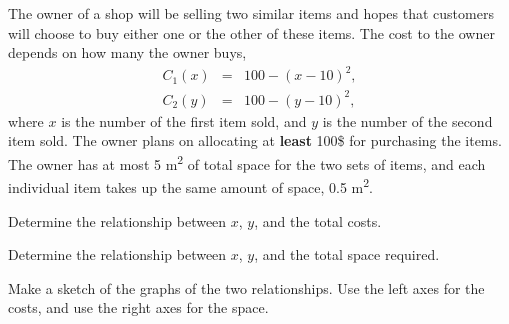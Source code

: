 \begin{problem}
\clearpage

\item The owner of a shop will be selling two similar items and hopes
  that customers will choose to buy either one or the other of these
  items. The cost to the owner depends on how many the owner buys,
  \begin{eqnarray*}
    C_1(x) & = & 100 - (x-10)^2, \\
    C_2(y) & = & 100 - (y-10)^2,
  \end{eqnarray*}
  where $x$ is the number of the first item sold, and $y$ is the
  number of the second item sold. The owner plans on allocating at
  \textbf{least} 100\$ for purchasing the items.  The owner has at most 5
  m\textsuperscript{2} of total space for the two sets of items, and
  each individual item takes up the same amount of space, 0.5
  m\textsuperscript{2}.

  \begin{subproblem}
    
  \item Determine the relationship between $x$, $y$, and the total
    costs.

    \vfill

  \item Determine the relationship between $x$, $y$, and the total
    space required.

    \vfill

  \item Make a sketch of the graphs of the two relationships. Use the
    left axes for the costs, and use the right axes for the space.


\end{subproblem}
\end{problem}

